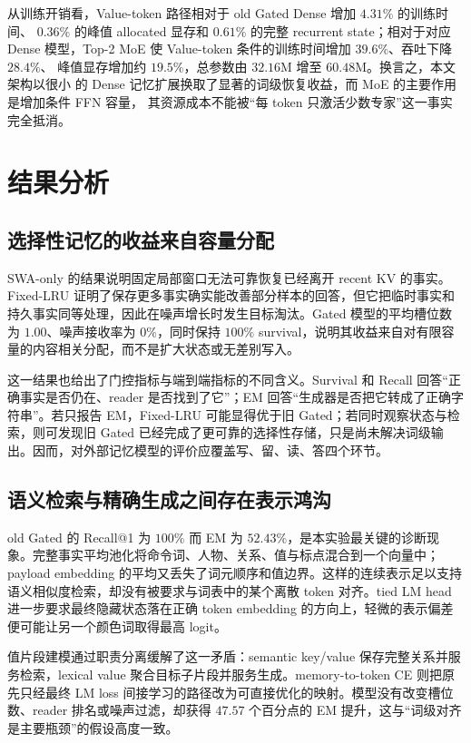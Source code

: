 \documentclass[letterpaper]{article}
\begin{document}
从训练开销看，Value-token 路径相对于 old Gated Dense 增加 $4.31\%$ 的训练时间、
$0.36\%$ 的峰值 allocated 显存和 $0.61\%$ 的完整 recurrent state；相对于对应 Dense
模型，Top-2 MoE 使 Value-token 条件的训练时间增加 $39.6\%$、吞吐下降 $28.4\%$、
峰值显存增加约 $19.5\%$，总参数由 $32.16$M 增至 $60.48$M。换言之，本文架构以很小
的 Dense 记忆扩展换取了显著的词级恢复收益，而 MoE 的主要作用是增加条件 FFN 容量，
其资源成本不能被“每 token 只激活少数专家”这一事实完全抵消。

\section{结果分析}

\subsection{选择性记忆的收益来自容量分配}

SWA-only 的结果说明固定局部窗口无法可靠恢复已经离开 recent KV 的事实。Fixed-LRU 证明了保存更多事实确实能改善部分样本的回答，但它把临时事实和持久事实同等处理，因此在噪声增长时发生目标淘汰。Gated 模型的平均槽位数为 $1.00$、噪声接收率为 $0\%$，同时保持 $100\%$ survival，说明其收益来自对有限容量的内容相关分配，而不是扩大状态或无差别写入。

这一结果也给出了门控指标与端到端指标的不同含义。Survival 和 Recall 回答“正确事实是否仍在、reader 是否找到了它”；EM 回答“生成器是否把它转成了正确字符串”。若只报告 EM，Fixed-LRU 可能显得优于旧 Gated；若同时观察状态与检索，则可发现旧 Gated 已经完成了更可靠的选择性存储，只是尚未解决词级输出。因而，对外部记忆模型的评价应覆盖写、留、读、答四个环节。

\subsection{语义检索与精确生成之间存在表示鸿沟}

old Gated 的 Recall@1 为 $100\%$ 而 EM 为 $52.43\%$，是本实验最关键的诊断现象。完整事实平均池化将命令词、人物、关系、值与标点混合到一个向量中；payload embedding 的平均又丢失了词元顺序和值边界。这样的连续表示足以支持语义相似度检索，却没有被要求与词表中的某个离散 token 对齐。tied LM head 进一步要求最终隐藏状态落在正确 token embedding 的方向上，轻微的表示偏差便可能让另一个颜色词取得最高 logit。

值片段建模通过职责分离缓解了这一矛盾：semantic key/value 保存完整关系并服务检索，lexical value 聚合目标子片段并服务生成。memory-to-token CE 则把原先只经最终 LM loss 间接学习的路径改为可直接优化的映射。模型没有改变槽位数、reader 排名或噪声过滤，却获得 $47.57$ 个百分点的 EM 提升，这与“词级对齐是主要瓶颈”的假设高度一致。
\end{document}
